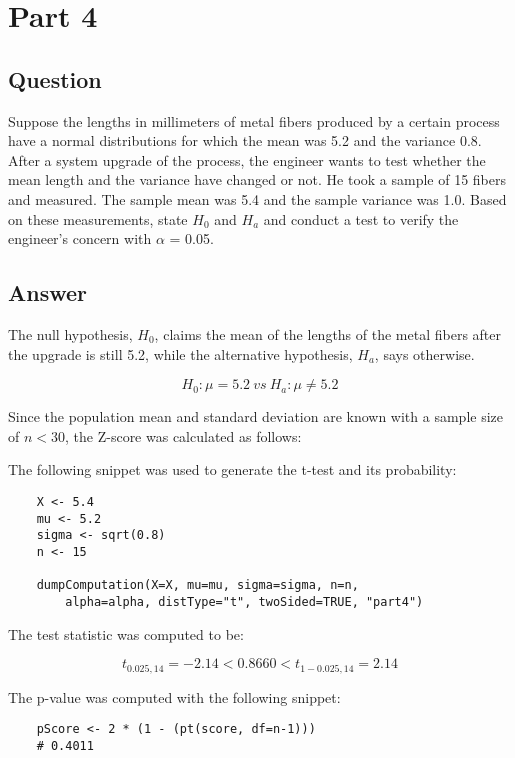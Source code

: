 \section{Part 4}
    \subsection{Question}
    Suppose the lengths in millimeters of metal fibers produced by a certain process have a normal distributions for which the mean was 5.2 and the variance 0.8. After a system upgrade of the process, the engineer wants to test whether the mean length and the variance have changed or not. He took a sample of 15 fibers and measured. The sample mean was 5.4 and the sample variance was 1.0. Based on these measurements, state $H_{0}$ and $H_{a}$ and conduct a test to verify the engineer's concern with $\alpha$ = 0.05.

    \subsection{Answer}
    The null hypothesis, $H_{0}$, claims the mean of the lengths of the metal fibers after the upgrade is still 5.2, while the alternative hypothesis, $H_{a}$, says otherwise.

        \[ H_{0}: \mu = 5.2 \ vs \ H_{a}: \mu \neq 5.2 \]

    Since the population mean and standard deviation are known with a sample size of $n < 30$, the Z-score was calculated as follows:

        \newline

    The following snippet was used to generate the t-test and its probability:
\begin{lstlisting}
    X <- 5.4
    mu <- 5.2
    sigma <- sqrt(0.8)
    n <- 15

    dumpComputation(X=X, mu=mu, sigma=sigma, n=n, 
        alpha=alpha, distType="t", twoSided=TRUE, "part4")
\end{lstlisting}

    The test statistic was computed to be:

    \begin{equation*}
        t_{0.025, 14}=-2.14 < 0.8660 < t_{1-0.025, 14}=2.14
    \end{equation*}

    The p-value was computed with the following snippet:
\begin{lstlisting}
    pScore <- 2 * (1 - (pt(score, df=n-1)))
    # 0.4011
\end{lstlisting}

